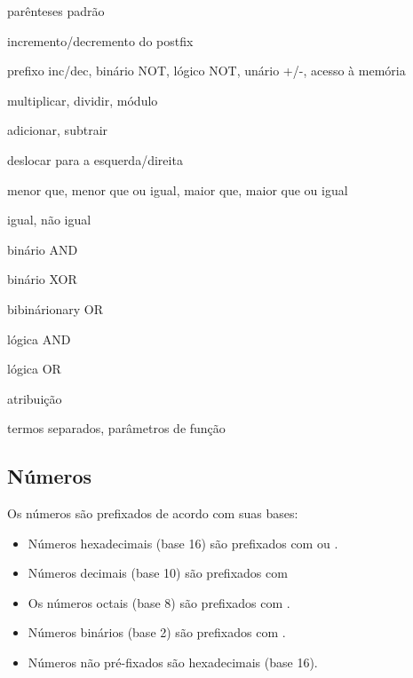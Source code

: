 \documentclass[letterpaper,10pt,brazil]{sphinxmanual}
\begin{document}
\begin{DUlineblock}{0em}
\item[] 
\item[] 
\item[] 
\item[] \sphinxcode{( ) :} parênteses padrão
\item[] \sphinxcode{++ -{-} :} incremento/decremento do postfix
\item[]  prefixo inc/dec, binário NOT, lógico NOT, unário +/-, acesso à memória
\item[] \sphinxcode{* / \% :} multiplicar, dividir, módulo
\item[] \sphinxcode{+ - :} adicionar, subtrair
\item[] \sphinxcode{\textless{}\textless{} \textgreater{}\textgreater{} :} deslocar para a esquerda/direita
\item[] \sphinxcode{\textless{} \textless{}= \textgreater{} \textgreater{}= :} menor que, menor que ou igual, maior que, maior que ou igual
\item[] \sphinxcode{== != :} igual, não igual
\item[] \sphinxcode{\& :} binário AND
\item[] \sphinxcode{\textasciicircum{} :} binário XOR
\item[] \sphinxcode{\textbar{} :} bibinárionary OR
\item[] \sphinxcode{\&\& :} lógica AND
\item[] \sphinxcode{\textbar{}\textbar{} :} lógica OR
\item[] \sphinxcode{= \textbackslash{}*= /= \%= += -= \textless{}\textless{}= \textgreater{}\textgreater{}= \&= \textbackslash{}\textbar{}= \textasciicircum{}= :} atribuição
\item[] \sphinxcode{, :} termos separados, parâmetros de função
\end{DUlineblock}


\subsection{Números}
\label{debugger/expressions:numeros}
Os números são prefixados de acordo com suas bases:
\begin{itemize}
\item {} 
Números hexadecimais (base 16) são prefixados com \sphinxcode{\$} ou .

\item {} 
Números decimais (base 10) são prefixados com \sphinxcode{\#}

\item {} 
Os números octais (base 8) são prefixados com .

\item {} 
Números binários (base 2) são prefixados com .

\item {} 
Números não pré-fixados são hexadecimais (base 16).

\end{itemize}
\end{document}
